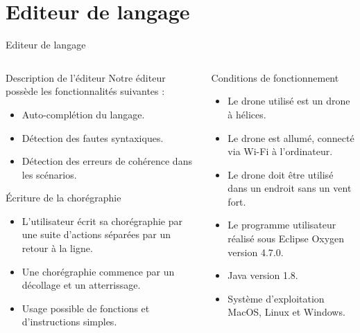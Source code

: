 \documentclass{bredelebeamer}
\begin{document}
\section{Editeur de langage}

\begin{frame}{Editeur de langage}
\begin{columns}
\begin{column}{0.5\textwidth}
\begin{block}{Description de l'éditeur}
Notre éditeur possède les fonctionnalités suivantes :
\begin{itemize}
\item Auto-complétion du langage. 
\item Détection des fautes syntaxiques.
\item Détection des erreurs de cohérence dans les scénarios.
\end{itemize}
\end{block}\pause


\begin{block}{Écriture de la chorégraphie}
\begin{itemize}
\item L'utilisateur écrit sa chorégraphie par une suite d'actions séparées par un retour à la ligne.
\item Une chorégraphie commence par un décollage et un atterrissage.
\item Usage possible de fonctions et d'instructions simples.
\end{itemize}
\end{block}\pause
\end{column}
\begin{column}{0.5\textwidth}
\begin{alertblock}{Conditions de fonctionnement}
\begin{itemize}
\item Le drone utilisé est un drone à hélices. 
\item Le drone est allumé, connecté via Wi-Fi à l’ordinateur.
\item Le drone doit être utilisé dans un endroit sans un vent fort.
\item Le programme utilisateur réalisé sous Eclipse Oxygen version 4.7.0.
\item Java version 1.8. 
\item Système d'exploitation MacOS, Linux et Windows.
\end{itemize}
\end{alertblock}
\vspace{80px}
\end{column}
\end{columns}
\end{frame}
\end{document}
